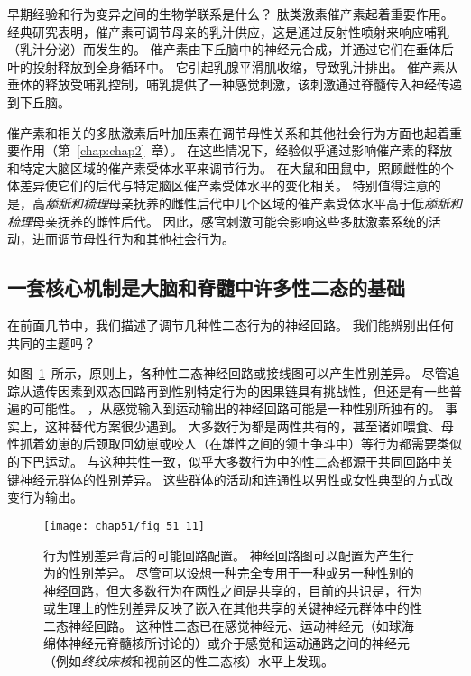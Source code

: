 早期经验和行为变异之间的生物学联系是什么？
肽类激素催产素起着重要作用。
经典研究表明，催产素可调节母亲的乳汁供应，这是通过反射性喷射来响应哺乳（乳汁分泌）而发生的。
催产素由下丘脑中的神经元合成，并通过它们在垂体后叶的投射释放到全身循环中。
它引起乳腺平滑肌收缩，导致乳汁排出。
催产素从垂体的释放受哺乳控制，哺乳提供了一种感觉刺激，该刺激通过脊髓传入神经传递到下丘脑。


催产素和相关的多肽激素后叶加压素在调节母性关系和其他社会行为方面也起着重要作用（第~\ref{chap:chap2}~章）。
在这些情况下，经验似乎通过影响催产素的释放和特定大脑区域的催产素受体水平来调节行为。
在大鼠和田鼠中，照顾雌性的个体差异使它们的后代与特定脑区催产素受体水平的变化相关。
特别值得注意的是，高\textit{舔舐和梳理}母亲抚养的雌性后代中几个区域的催产素受体水平高于低\textit{舔舐和梳理}母亲抚养的雌性后代。
因此，感官刺激可能会影响这些多肽激素系统的活动，进而调节母性行为和其他社会行为。



\subsection{一套核心机制是大脑和脊髓中许多性二态的基础}

在前面几节中，我们描述了调节几种性二态行为的神经回路。
我们能辨别出任何共同的主题吗？


如图~\ref{fig:51_11}~所示，原则上，各种性二态神经回路或接线图可以产生性别差异。
尽管追踪从遗传因素到双态回路再到性别特定行为的因果链具有挑战性，但还是有一些普遍的可能性。 
，从感觉输入到运动输出的神经回路可能是一种性别所独有的。
事实上，这种替代方案很少遇到。
大多数行为都是两性共有的，甚至诸如喂食、母性抓着幼崽的后颈取回幼崽或咬人（在雄性之间的领土争斗中）等行为都需要类似的下巴运动。
与这种共性一致，似乎大多数行为中的性二态都源于共同回路中关键神经元群体的性别差异。
这些群体的活动和连通性以男性或女性典型的方式改变行为输出。


\begin{figure}[htbp]
	\centering
	\texttt{[image: chap51/fig\_51\_11]}
	\caption{行为性别差异背后的可能回路配置。
		神经回路图可以配置为产生行为的性别差异。
		尽管可以设想一种完全专用于一种或另一种性别的神经回路，但大多数行为在两性之间是共享的，目前的共识是，行为或生理上的性别差异反映了嵌入在其他共享的关键神经元群体中的性二态神经回路。
		这种性二态已在感觉神经元、运动神经元（如球海绵体神经元脊髓核所讨论的）或介于感觉和运动通路之间的神经元（例如\textit{终纹床核}和视前区的性二态核）水平上发现。}
	\label{fig:51_11}
\end{figure}


